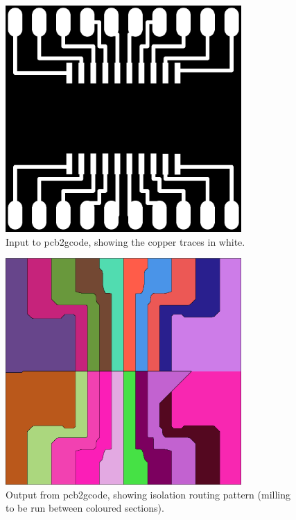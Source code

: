\begin{figure}[ht!]
\centering
\includegraphics[width=90mm]{resources/breakout_copper.png}
\caption{Input to pcb2gcode, showing the copper traces in white.}
\label{pcb2gcodeinput}
\end{figure}

\begin{figure}[ht!]
\centering
\includegraphics[width=90mm]{resources/breakout_isolation.png}
\caption{Output from pcb2gcode, showing isolation routing pattern (milling to be run between coloured sections).}
\label{pcb2gcodeisolation}
\end{figure}


